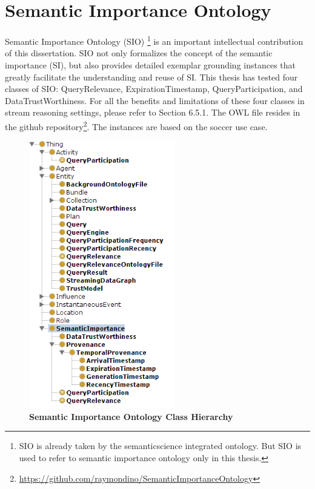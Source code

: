  
\appendix    %

\chapter{Semantic Importance Ontology}
Semantic Importance Ontology (SIO) \footnote{SIO is already taken by the semanticscience integrated ontology. But SIO is used to refer to semantic importance ontology only in this thesis.} is an important intellectual contribution of this dissertation. 
SIO not only formalizes the concept of the semantic importance (SI), but also provides detailed exemplar grounding instances that greatly facilitate the understanding and reuse of SI. 
This thesis has tested four classes of SIO: QueryRelevance, ExpirationTimestamp, QueryParticipation, and DataTrustWorthiness.
For all the benefits and limitations of these four classes in stream reasoning settings, please refer to Section 6.5.1.
The OWL file resides in the github repository\footnote{\url{https://github.com/raymondino/SemanticImportanceOntology}}.
The instances are based on the soccer use case.

\begin{figure}[!htbp]
    \centering
    \includegraphics[width=2.5in]{img/app-sio.png}
    \caption{\textbf{Semantic Importance Ontology Class Hierarchy}}
    \label{fig:app-sio}
\end{figure}

